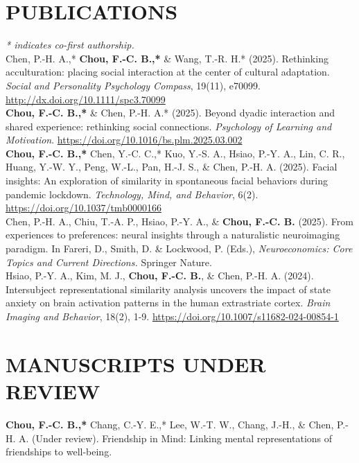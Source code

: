 \documentclass[a4paper,12pt]{article}
\newcommand{\itemspace}{7pt} %
\begin{document}
\section*{PUBLICATIONS}
\textit{* indicates co-first authorship.} \\[10pt]
\noindent Chen, P.-H. A.,* \textbf{Chou, F.-C. B.,*} \& Wang, T.-R. H.* (2025). Rethinking acculturation: placing social interaction at the center of cultural adaptation. \textit{Social and Personality Psychology Compass}, 19(11), e70099. \href{http://dx.doi.org/10.1111/spc3.70099}{http://dx.doi.org/10.1111/spc3.70099} \\[\itemspace]
\noindent \textbf{Chou, F.-C. B.,*} \& Chen, P.-H. A.* (2025). Beyond dyadic interaction and shared experience: rethinking social connections. \textit{Psychology of Learning and Motivation}. \href{https://10.1016/bs.plm.2025.03.002}{https://doi.org/10.1016/bs.plm.2025.03.002} \\[\itemspace]
\noindent\textbf{Chou, F.-C. B.,*} Chen, Y.-C. C.,* Kuo, Y.-S. A., Hsiao, P.-Y. A., Lin, C. R., Huang, Y.-W. Y., Peng, W.-L., Pan, H.-J. S., \& Chen, P.-H. A. (2025). Facial insights: An exploration of similarity in spontaneous facial behaviors during pandemic lockdown. \textit{Technology, Mind, and Behavior}, 6(2). \href{https://doi.org/10.1037/tmb0000166}{https://doi.org/10.1037/tmb0000166} \\[\itemspace]
\noindent Chen, P.-H. A., Chiu, T.-A. P., Hsiao, P.-Y. A., \& \textbf{Chou, F.-C. B.} (2025). From experiences to preferences: neural insights through a naturalistic neuroimaging paradigm. In Fareri, D., Smith, D. \& Lockwood, P. (Eds.), \textit{Neuroeconomics: Core Topics and Current Directions.} Springer Nature.\\[\itemspace]
\noindent Hsiao, P.-Y. A., Kim, M. J., \textbf{Chou, F.-C. B.}, \& Chen, P.-H. A. (2024). Intersubject representational similarity analysis uncovers the impact of state anxiety on brain activation patterns in the human extrastriate cortex. \textit{Brain Imaging and Behavior}, 18(2), 1-9. \href{https://doi.org/10.1007/s11682-024-00854-1}{https://doi.org/10.1007/s11682-024-00854-1}\\[\itemspace]

\section*{MANUSCRIPTS UNDER REVIEW}
\noindent \textbf{Chou, F.-C. B.,*} Chang, C.-Y. E.,* Lee, W.-T. W., Chang, J.-H., \& Chen, P.-H. A. (Under review). Friendship in Mind: Linking mental representations of friendships to well-being.\\[\itemspace]
\end{document}
